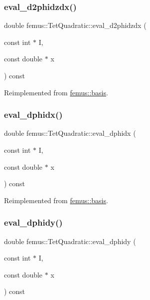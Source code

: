 \subsubsection{\texorpdfstring{eval\+\_\+d2phidzdx()}{eval\_d2phidzdx()}}
{\footnotesize\ttfamily double femus\+::\+Tet\+Quadratic\+::eval\+\_\+d2phidzdx (\begin{DoxyParamCaption}\item[{const int $\ast$}]{I,  }\item[{const double $\ast$}]{x }\end{DoxyParamCaption}) const\hspace{0.3cm}{\ttfamily [virtual]}}



Reimplemented from \mbox{\hyperlink{classfemus_1_1basis_a5d619ec5bd57b7d2dc34a99d69975c77}{femus\+::basis}}.

\mbox{\label{classfemus_1_1_tet_quadratic_a509e172f88aabecc48e0c6d25b22889d}} 
\subsubsection{\texorpdfstring{eval\+\_\+dphidx()}{eval\_dphidx()}}
{\footnotesize\ttfamily double femus\+::\+Tet\+Quadratic\+::eval\+\_\+dphidx (\begin{DoxyParamCaption}\item[{const int $\ast$}]{I,  }\item[{const double $\ast$}]{x }\end{DoxyParamCaption}) const\hspace{0.3cm}{\ttfamily [virtual]}}



Reimplemented from \mbox{\hyperlink{classfemus_1_1basis_a4db7d29cf8a753ddbccc4a297dafa0bf}{femus\+::basis}}.

\mbox{\label{classfemus_1_1_tet_quadratic_a68b5b101bab88132574d0d96f29daeb2}} 
\subsubsection{\texorpdfstring{eval\+\_\+dphidy()}{eval\_dphidy()}}
{\footnotesize\ttfamily double femus\+::\+Tet\+Quadratic\+::eval\+\_\+dphidy (\begin{DoxyParamCaption}\item[{const int $\ast$}]{I,  }\item[{const double $\ast$}]{x }\end{DoxyParamCaption}) const\hspace{0.3cm}{\ttfamily [virtual]}}



